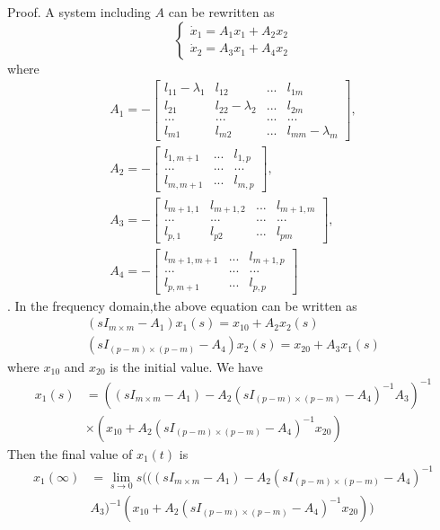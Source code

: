 \documentclass[english]{cccconf}
\begin{document}
{{Proof.  A system including $A$ can be rewritten as
\[\left\{ \begin{array}{l}
{{\dot x}_1} = {A_1}{x_1} + {A_2}{x_2}\\
{{\dot x}_2} = {A_3}{x_1} + {A_4}{x_2}
\end{array} \right.\]
where
\[\begin{array}{l}
{A_1} =  - \left[ {\begin{array}{*{20}{c}}
{{l_{11}} - {\lambda _1}}&{{l_{12}}}&{...}&{{l_{1m}}}\\
{{l_{21}}}&{{l_{22}} - {\lambda _2}}&{...}&{{l_{2m}}}\\
{...}&{...}&{...}&{...}\\
{{l_{m1}}}&{{l_{m2}}}&{...}&{{l_{mm}} - {\lambda _m}}
\end{array}} \right],\\
{A_2} =  - \left[ {\begin{array}{*{20}{c}}
{{l_{1,m + 1}}}&{...}&{{l_{1,p}}}\\
{...}&{...}&{...}\\
{{l_{m,m + 1}}}&{...}&{{l_{m,p}}}
\end{array}} \right],\\
{A_3} =  - \left[ {\begin{array}{*{20}{c}}
{{l_{m + 1,1}}}&{{l_{m + 1,2}}}&{...}&{{l_{m + 1,m}}}\\
{...}&{...}&{...}&{...}\\
{{l_{p,1}}}&{{l_{p2}}}&{...}&{{l_{pm}}}
\end{array}} \right],\\
{A_4} =  - \left[ {\begin{array}{*{20}{c}}
{{l_{m + 1,m + 1}}}&{...}&{{l_{m + 1,p}}}\\
{...}&{...}&{...}\\
{{l_{p,m + 1}}}&{...}&{{l_{p,p}}}
\end{array}} \right]
\end{array}\].
 In the frequency domain,the above equation can be written as
\[\begin{array}{l}
(s{I_{m \times m}} - {A_1}){x_1}(s) = {x_{10}} + {A_2}{x_2}(s)\\
(s{I_{(p - m) \times (p - m)}} - {A_4}){x_2}(s) = {x_{20}} + {A_3}{x_1}(s)
\end{array}\]
where $x_{10}$ and $x_{20}$  is the initial value.
 We have
 \begin{align}
{x_1}(s) &= {((s{I_{m \times m}} - {A_1}) - {A_2}{(s{I_{(p - m) \times (p - m)}} - {A_4})^{ - 1}}{A_3})^{ - 1}} \nonumber \\
 &\times ({x_{10}} + {A_2}{(s{I_{(p - m) \times (p - m)}} - {A_4})^{ - 1}}{x_{20}})\nonumber
\end{align}
Then the final value of $x_1(t)$ is
\begin{align}
{x_1}(\infty ) &= \mathop {\lim }\limits_{s \to 0} s(((s{I_{m \times m}} - {A_1}) - {A_2}{(s{I_{(p - m) \times (p - m)}} - {A_4})^{ - 1}}\nonumber\\
&{A_3}{)^{ - 1}}({x_{10}} + {A_2}{(s{I_{(p - m) \times (p - m)}} - {A_4})^{ - 1}}{x_{20}}))
\end{align}

}}
\end{document}
